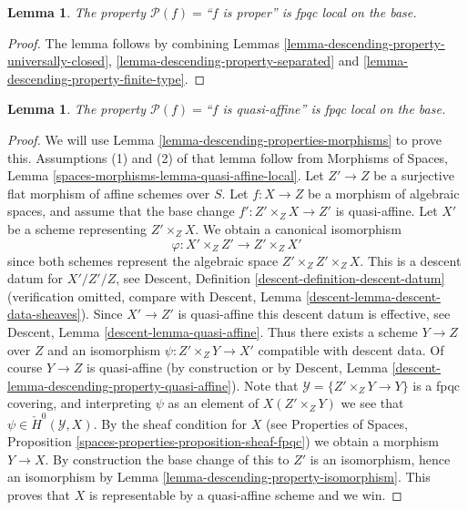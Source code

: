 \documentclass{stacks-project}
\theoremstyle{plain}
\newtheorem{lemma}[subsection]{Lemma}
\theoremstyle{definition}
\theoremstyle{remark}
\numberwithin{equation}{subsection}
\begin{document}
\begin{lemma}
\label{lemma-descending-property-proper}
The property $\mathcal{P}(f) =$``$f$ is proper''
is fpqc local on the base.
\end{lemma}

\begin{proof}
The lemma follows by combining
Lemmas \ref{lemma-descending-property-universally-closed},
\ref{lemma-descending-property-separated}
and \ref{lemma-descending-property-finite-type}.
\end{proof}

\begin{lemma}
\label{lemma-descending-property-quasi-affine}
The property $\mathcal{P}(f) =$``$f$ is quasi-affine''
is fpqc local on the base.
\end{lemma}

\begin{proof}
We will use
Lemma \ref{lemma-descending-properties-morphisms}
to prove this. Assumptions (1) and (2) of that lemma follow from
Morphisms of Spaces,
Lemma \ref{spaces-morphisms-lemma-quasi-affine-local}.
Let $Z' \to Z$ be a surjective flat morphism of affine schemes over $S$.
Let $f : X \to Z$ be a morphism of algebraic spaces, and assume
that the base change $f' : Z' \times_Z X \to Z'$ is quasi-affine.
Let $X'$ be a scheme representing $Z' \times_Z X$.
We obtain a canonical isomorphism
$$
\varphi : X' \times_Z Z' \longrightarrow Z' \times_Z X'
$$
since both schemes represent the algebraic space $Z' \times_Z Z' \times_Z X$.
This is a descent datum for $X'/Z'/Z$, see
Descent, Definition \ref{descent-definition-descent-datum}
(verification omitted, compare with
Descent, Lemma \ref{descent-lemma-descent-data-sheaves}).
Since $X' \to Z'$ is quasi-affine this descent datum is effective, see
Descent, Lemma \ref{descent-lemma-quasi-affine}.
Thus there exists a scheme $Y \to Z$ over $Z$ and an
isomorphism $\psi : Z' \times_Z Y \to X'$ compatible with descent data.
Of course $Y \to Z$ is quasi-affine (by construction or by
Descent, Lemma \ref{descent-lemma-descending-property-quasi-affine}).
Note that $\mathcal{Y} = \{Z' \times_Z Y \to Y\}$ is a
fpqc covering, and interpreting $\psi$ as an element of
$X(Z' \times_Z Y)$ we see that $\psi \in \check{H}^0(\mathcal{Y}, X)$.
By the sheaf condition for $X$ (see
Properties of Spaces, Proposition
\ref{spaces-properties-proposition-sheaf-fpqc})
we obtain a morphism $Y \to X$.
By construction the base change of this to $Z'$ is an isomorphism, hence
an isomorphism by
Lemma \ref{lemma-descending-property-isomorphism}.
This proves that $X$ is representable by a quasi-affine scheme and we win.
\end{proof}
\end{document}
